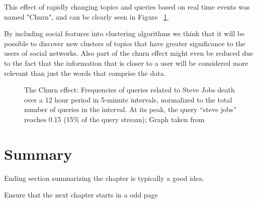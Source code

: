 This effect of rapidly changing topics and queries based on real time events was named "Churn", and can be clearly seen in Figure ~\ref{fig:churn}.

By including social features into clustering algorithms we think that it will be possible to discover new clusters of topics that have greater significance to the users of social networks. Also part of the churn effect might even be reduced due to the fact that the information that is closer to a user will be considered more relevant than just the words that comprise the data.  

\begin{figure}[tb]
  \begin{center}
    \noindent{}
  \end{center}
  \caption{The Churn effect: Frequencies of queries related to Steve Jobs death over a 12 hour period in 5-minute intervals, normalized to the total number of queries in the interval. At its peak, the query “steve jobs” reaches 0.15 (15\% of the query stream); Graph taken from~\cite{Lin2012}}
  \label{fig:churn}
\end{figure}


\section{Summary}
Ending section summarizing the chapter is typically a good idea.

Ensure that the next chapter starts in a odd page
\cleardoublepage 
